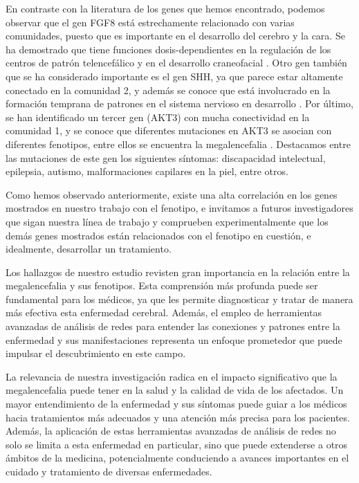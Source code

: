 En contraste con la literatura de los genes que hemos encontrado, podemos observar que el gen FGF8 está estrechamente relacionado con varias comunidades, puesto que es importante en el desarrollo del cerebro y la cara. Se ha demostrado que tiene funciones dosis-dependientes en la regulación de los centros de patrón telencefálico y en el desarrollo craneofacial \cite{fgf8}. Otro gen también que se ha considerado importante es el gen SHH, ya que parece estar altamente conectado en la comunidad 2, y además se conoce que está involucrado en la formación temprana de patrones en el sistema nervioso en desarrollo \cite{winden_megalencephaly_2015}. Por último, se han identificado un tercer gen (AKT3) con mucha conectividad en la comunidad 1, y se conoce que diferentes mutaciones en AKT3 se asocian con diferentes fenotipos, entre ellos se encuentra la megalencefalia \cite{akt3}. Destacamos entre las mutaciones de este gen los siguientes síntomas: discapacidad intelectual, epilepsia, autismo, malformaciones capilares en la piel, entre otros.

Como hemos observado anteriormente, existe una alta correlación en los genes mostrados en nuestro trabajo con el fenotipo, e invitamos a futuros investigadores que sigan nuestra línea de trabajo y comprueben experimentalmente que los demás genes mostrados están relacionados con el fenotipo en cuestión, e idealmente, desarrollar un tratamiento.




Los hallazgos de nuestro estudio revisten gran importancia en la relación entre la megalencefalia y sus fenotipos. Esta comprensión más profunda puede ser fundamental para los médicos, ya que les permite diagnosticar y tratar de manera más efectiva esta enfermedad cerebral. Además, el empleo de herramientas avanzadas de análisis de redes para entender las conexiones y patrones entre la enfermedad y sus manifestaciones representa un enfoque prometedor que puede impulsar el descubrimiento en este campo.

La relevancia de nuestra investigación radica en el impacto significativo que la megalencefalia puede tener en la salud y la calidad de vida de los afectados. Un mayor entendimiento de la enfermedad y sus síntomas puede guiar a los médicos hacia tratamientos más adecuados y una atención más precisa para los pacientes. Además, la aplicación de estas herramientas avanzadas de análisis de redes no solo se limita a esta enfermedad en particular, sino que puede extenderse a otros ámbitos de la medicina, potencialmente conduciendo a avances importantes en el cuidado y tratamiento de diversas enfermedades.